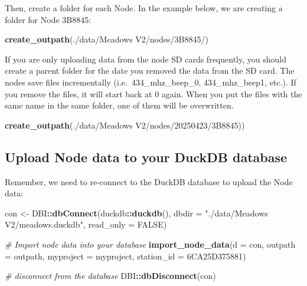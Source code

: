 \documentclass[
]{book}
\newenvironment{Shaded}{\begin{snugshade}}{\end{snugshade}}
\newcommand{\AttributeTok}[1]{\textcolor[rgb]{0.13,0.29,0.53}{#1}}
\newcommand{\CommentTok}[1]{\textcolor[rgb]{0.56,0.35,0.01}{\textit{#1}}}
\newcommand{\ConstantTok}[1]{\textcolor[rgb]{0.56,0.35,0.01}{#1}}
\newcommand{\FunctionTok}[1]{\textcolor[rgb]{0.13,0.29,0.53}{\textbf{#1}}}
\newcommand{\NormalTok}[1]{#1}
\newcommand{\OtherTok}[1]{\textcolor[rgb]{0.56,0.35,0.01}{#1}}
\newcommand{\SpecialCharTok}[1]{\textcolor[rgb]{0.81,0.36,0.00}{\textbf{#1}}}
\newcommand{\StringTok}[1]{\textcolor[rgb]{0.31,0.60,0.02}{#1}}
\begin{document}
Then, create a folder for each Node. In the example below, we are creating a folder for Node 3B8845:

\begin{Shaded}
\begin{Highlighting}[]
\FunctionTok{create\_outpath}\NormalTok{(}\StringTok{\textquotesingle{}./data/Meadows V2/nodes/3B8845/\textquotesingle{}}\NormalTok{)}
\end{Highlighting}
\end{Shaded}

If you are only uploading data from the node SD cards frequently, you should create a parent folder for the date you removed the data from the SD card. The nodes save files incrementally (i.e.~434\_mhz\_beep\_0, 434\_mhz\_beep1, etc.). If you remove the files, it will start back at 0 again. When you put the files with the same name in the same folder, one of them will be overwritten.

\begin{Shaded}
\begin{Highlighting}[]
\FunctionTok{create\_outpath}\NormalTok{(}\StringTok{\textquotesingle{}./data/Meadows V2/nodes/20250423/3B8845)\textquotesingle{}}\NormalTok{)}
\end{Highlighting}
\end{Shaded}

\subsection{Upload Node data to your DuckDB database}\label{upload-node-data-to-your-duckdb-database}

Remember, we need to re-connect to the DuckDB database to upload the Node data:

\begin{Shaded}
\begin{Highlighting}[]
\NormalTok{con }\OtherTok{\textless{}{-}}\NormalTok{ DBI}\SpecialCharTok{::}\FunctionTok{dbConnect}\NormalTok{(duckdb}\SpecialCharTok{::}\FunctionTok{duckdb}\NormalTok{(), }
                      \AttributeTok{dbdir =} \StringTok{"./data/Meadows V2/meadows.duckdb"}\NormalTok{, }
                      \AttributeTok{read\_only =} \ConstantTok{FALSE}\NormalTok{)}

\CommentTok{\# Import node data into your database}
\FunctionTok{import\_node\_data}\NormalTok{(}\AttributeTok{d =}\NormalTok{ con,}
                 \AttributeTok{outpath =}\NormalTok{ outpath,}
                 \AttributeTok{myproject =}\NormalTok{ myproject,}
                 \AttributeTok{station\_id =} \StringTok{\textquotesingle{}6CA25D375881\textquotesingle{}}\NormalTok{)}

\CommentTok{\# disconnect from the database}
\NormalTok{DBI}\SpecialCharTok{::}\FunctionTok{dbDisconnect}\NormalTok{(con)}
\end{Highlighting}
\end{Shaded}
\end{document}
